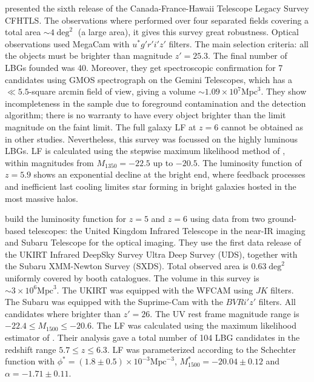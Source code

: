\documentclass{emulateapj}
\begin{document}
\citet{Willott13} presented the sixth release of the Canada-France-Hawaii 
Telescope Legacy Survey CFHTLS. The observations where performed over four 
separated fields covering a total area $\sim 4 \deg^2$ (a large area), it gives this 
survey great robustness. Optical observations used MegaCam  %
with $u^* g' r' i' z'$ filters. The main selection criteria: all the 
objects must be brighter than magnitude $z' = 25.3$. The final 
number of LBGs founded was 40. Moreover, they get spectroscopic confirmation 
for 7 candidates using GMOS spectrograph on the Gemini Telescopes, which 
has a $\ll 5.5$-square arcmin field of view, giving a volume $\sim 1.09 \times 10^7 \textrm{Mpc}^3$. 
They show incompleteness in the sample due to 
foreground contamination and the detection algorithm; there is no warranty to 
have every object brighter than the limit magnitude on the faint limit. The full 
galaxy LF at $z=6$ cannot be obtained as in other studies. Nevertheless, this survey 
was focussed on the highly luminous LBGs. LF is calculated using the stepwise 
maximum likelihood method of \citet{Efstathiou88}, within 
magnitudes 
from $M_{1350} = -22.5$ up to $-20.5$. The luminosity function of $z=5.9$ shows 
an exponential decline at the bright end, where feedback processes and inefficient 
last cooling limites star forming in bright galaxies hosted in the most massive halos.

\citet{McLure09} build the luminosity function for $z=5$ and $z=6$ using data from two ground-based
 telescopes: the United Kingdom Infrared Telescope in the near-IR imaging and Subaru 
 Telescope for the optical imaging. They use the first data release of the UKIRT Infrared 
 DeepSky Survey Ultra Deep Survey (UDS), together with the Subaru XMM-Newton 
 Survey (SXDS). Total observed area is $0.63 \deg^2$ uniformly covered by booth catalogues.
The volume in this survey is $\sim 3 \times 10^6 \textrm{Mpc}^3$.
The UKIRT was equipped with the WFCAM using $J K$ filters. The Subaru was equipped 
with the Suprime-Cam with the $B V R i' z'$ filters. All candidates where brighter than 
$z'=26$. The UV rest frame magnitude range is $-22.4\leq M_{1500} \leq-20.6$. The LF 
was calculated using the maximum likelihood estimator of \citet{Schmidt68}. 
Their analysis gave a total number of 104 LBG candidates in the redshift range 
$5.7\leq z \leq 6.3$. LF was parameterized according to the Schechter function with 
$\phi^*  =(1.8 \pm 0.5) \times 10 ^{-3}  \textrm{Mpc}^{-3}$, $M^*_{1500} = -20.04\pm 0.12$ 
and $\alpha = -1.71 \pm 0.11$. 
\end{document}
